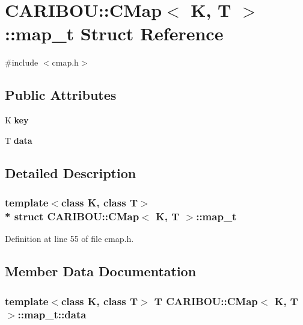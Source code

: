 \section{C\+A\+R\+I\+B\+OU\+:\+:C\+Map$<$ K, T $>$\+:\+:map\+\_\+t Struct Reference}
\label{struct_c_a_r_i_b_o_u_1_1_c_map_1_1map__t}


{\ttfamily \#include $<$cmap.\+h$>$}

\subsection*{Public Attributes}
\begin{DoxyCompactItemize}
\item 
K {\bf key}
\item 
T {\bf data}
\end{DoxyCompactItemize}


\subsection{Detailed Description}
\subsubsection*{template$<$class K, class T$>$\\*
struct C\+A\+R\+I\+B\+O\+U\+::\+C\+Map$<$ K, T $>$\+::map\+\_\+t}



Definition at line 55 of file cmap.\+h.



\subsection{Member Data Documentation}
\subsubsection[{data}]{\setlength{\rightskip}{0pt plus 5cm}template$<$class K, class T$>$ T {\bf C\+A\+R\+I\+B\+O\+U\+::\+C\+Map}$<$ K, T $>$\+::map\+\_\+t\+::data}\label{struct_c_a_r_i_b_o_u_1_1_c_map_1_1map__t_a61811c822bd4a20b72e10e7b570d40f2}


